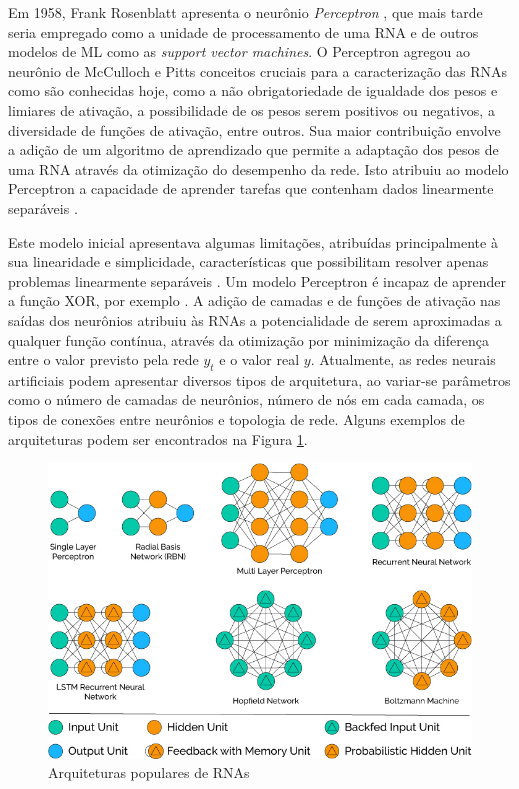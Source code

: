 Em 1958, Frank Rosenblatt apresenta o neurônio \emph{Perceptron} \cite{rosenblatt1958perceptron}, que mais tarde seria empregado como a unidade de processamento de uma RNA e de outros modelos de ML como as \emph{support vector machines}. O Perceptron agregou ao neurônio de McCulloch e Pitts conceitos cruciais para a caracterização das RNAs como são conhecidas hoje, como a não obrigatoriedade de igualdade dos pesos e limiares de ativação, a possibilidade de os pesos serem positivos ou negativos, a diversidade de funções de ativação, entre outros. Sua maior contribuição envolve a adição de um algoritmo de aprendizado que permite a adaptação dos pesos de uma RNA através da otimização do desempenho da rede. Isto atribuiu ao modelo Perceptron a capacidade de aprender tarefas que contenham dados linearmente separáveis \cite{braga2000redes}.

Este modelo inicial apresentava algumas limitações, atribuídas principalmente à sua linearidade e simplicidade, características que possibilitam resolver apenas problemas linearmente separáveis \cite{braga2000redes}. Um modelo Perceptron é incapaz de aprender a função XOR, por exemplo \cite{goodfellow2016deep}. A adição de camadas e de funções de ativação nas saídas dos neurônios atribuiu às RNAs a potencialidade de serem aproximadas a qualquer função contínua, através da otimização por minimização da diferença entre o valor previsto pela rede $y_t$ e o valor real $y$. Atualmente, as redes neurais artificiais podem apresentar diversos tipos de arquitetura, ao variar-se parâmetros como o número de camadas de neurônios, número de nós em cada camada, os tipos de conexões entre neurônios e topologia de rede. Alguns exemplos de arquiteturas podem ser encontrados na Figura \ref{fig:popular_archs}.

\begin{figure}[!h]
	\includegraphics[width=\linewidth]{img/popular_archs}
	\caption{Arquiteturas populares de RNAs}
	\label{fig:popular_archs}
\end{figure}

